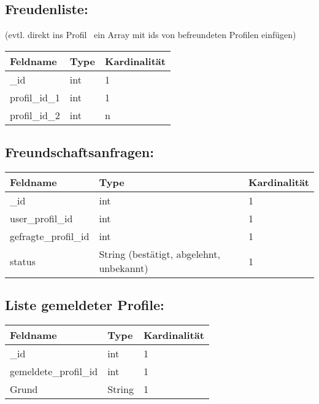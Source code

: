 \documentclass{article}
\begin{document}
\subsection[Freudenliste:]{Freudenliste:}
\textcolor{zubesprechen}{(evtl. direkt ins Profil \ ein Array mit ids von befreundeten Profilen einfügen)}

\begin{center}
\tablefirsthead{}
\tablehead{}
\tabletail{}
\tablelasttail{}
\begin{supertabular}{|m{5.467cm}|m{5.467cm}|m{5.467cm}|}
\hline
Feldname &
Type &
Kardinalität\\\hline
\_id &
int &
1\\\hline
profil\_id\_1 &
int &
1\\\hline
profil\_id\_2 &
int &
n\\\hline
\end{supertabular}
\end{center}

\subsection[Freundschaftsanfragen:]{Freundschaftsanfragen:}
\begin{center}
\tablefirsthead{}
\tablehead{}
\tabletail{}
\tablelasttail{}
\begin{supertabular}{|m{5.467cm}|m{5.467cm}|m{5.467cm}|}
\hline
Feldname &
Type &
Kardinalität\\\hline
\_id &
int &
1\\\hline
user\_profil\_id &
int &
1\\\hline
gefragte\_profil\_id &
int &
1\\\hline
status &
String (bestätigt, abgelehnt, unbekannt) &
1\\\hline
\end{supertabular}
\end{center}
\newpage
\subsection[Liste gemeldeter Profile]{Liste gemeldeter Profile:}
\begin{center}
\tablefirsthead{}
\tablehead{}
\tabletail{}
\tablelasttail{}
\begin{supertabular}{|m{5.467cm}|m{5.467cm}|m{5.467cm}|}
\hline
Feldname &
Type &
Kardinalität\\\hline
\_id &
int &
1\\\hline
gemeldete\_profil\_id &
int &
1\\\hline
Grund  &
String &
1\\\hline
\end{supertabular}
\end{center}
\end{document}
